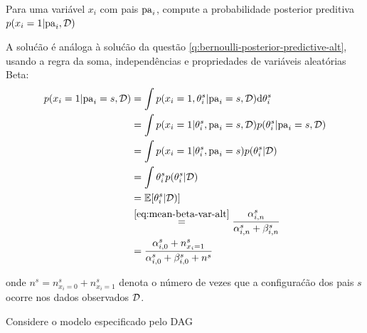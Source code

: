 \begin{exenumerate}
    \item \label{q:dgm-posterior-predictive-alt} Para uma vari\'avel $x_i$ com pais $\mathrm{pa}_i$, compute a probabilidade posterior preditiva $p(x_i=1|\mathrm{pa}_i, \mathcal{D})$
    
    \begin{solution}
        A solu\'c\~ao \'e an\'aloga \`a solu\'c\~ao da quest\~ao
        \ref{q:bernoulli-posterior-predictive-alt}, usando a regra da soma,
        independ\^encias e propriedades de vari\'aveis aleat\'orias Beta:
        \begin{align}
            p(x_i=1 |\mathrm{pa}_i=s, \mathcal{D}) &= \int p(x_i=1, \theta_i^s | \mathrm{pa}_i=s,
            \mathcal{D}) \mathrm{d} \theta_i^s\\ & = \int p(x_i=1 | \theta_i^s, \mathrm{pa}_i=s,
            \mathcal{D}) p(\theta_i^s | \mathrm{pa}_i=s , \mathcal{D})\\ & = \int p(x_i=1 |
            \theta_i^s, \mathrm{pa}_i=s) p(\theta_i^s | \mathcal{D})\\ & = \int \theta_i^s
            p(\theta_i^s | \mathcal{D})\\ & = \mathbb{E}[ \theta_i^s | \mathcal{D})]\\ &
            \overset{\eqref{eq:mean-beta-var-alt}}{=}
            \frac{\alpha_{i,n}^s}{\alpha_{i,n}^s+\beta_{i,n}^s}\\ & =
            \frac{\alpha_{i,0}^s+n^s_{x_i=1}}{\alpha_{i,0}^s+\beta_{i,0}^s+n^s}
            \label{eq:dgm-posterior-predictive-alt}
        \end{align}
    \end{solution}
    onde $n^s = n^s_{x_i=0}+n^s_{x_i=1}$ denota o n\'umero de vezes que
    a configura\'c\~ao dos pais $s$ ocorre nos dados observados $\mathcal{D}$.
    
\end{exenumerate}


Considere o modelo especificado pelo DAG

\begin{center}
\end{center}

